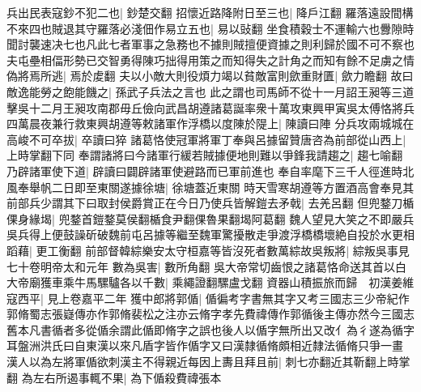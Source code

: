 兵出民表寇鈔不犯二也|{
	鈔楚交翻}
招懷近路降附日至三也|{
	降戶江翻}
羅落遠設間構不來四也賊退其守羅落必淺佃作易立五也|{
	易以䜴翻}
坐食積穀士不運輸六也釁隙時聞討襲速决七也凡此七者軍事之急務也不據則賊擅便資據之則利歸於國不可不察也夫屯壘相偪形勢已交智勇得陳巧拙得用策之而知得失之計角之而知有餘不足虜之情偽將焉所逃|{
	焉於䖍翻}
夫以小敵大則役煩力竭以貧敵富則歛重財匱|{
	歛力瞻翻}
故曰敵逸能勞之飽能饑之|{
	孫武子兵法之言也}
此之謂也司馬師不從十一月詔王昶等三道擊吳十二月王昶攻南郡毋丘儉向武昌胡遵諸葛誕率衆十萬攻東興甲寅吳太傅恪將兵四萬晨夜兼行救東興胡遵等敕諸軍作浮橋以度陳於隄上|{
	陳讀曰陣}
分兵攻兩城城在高峻不可卒拔|{
	卒讀曰猝}
諸葛恪使冠軍將軍丁奉與呂據留贊唐咨為前部從山西上|{
	上時掌翻下同}
奉謂諸將曰今諸軍行緩若賊據便地則難以爭鋒我請趨之|{
	趨七喻翻}
乃辟諸軍使下道|{
	辟讀曰闢辟諸軍使避路而已軍前進也}
奉自率麾下三千人徑進時北風奉舉帆二日即至東關遂據徐塘|{
	徐塘蓋近東關}
時天雪寒胡遵等方置酒高會奉見其前部兵少謂其下曰取封侯爵賞正在今日乃使兵皆解鎧去矛戟|{
	去羌呂翻}
但兜鍪刀楯倮身緣堨|{
	兜鍪首鎧鍪莫侯翻楯食尹翻倮魯果翻堨阿葛翻}
魏人望見大笑之不即嚴兵吳兵得上便鼓譟斫破魏前屯呂據等繼至魏軍驚擾散走爭渡浮橋橋壞絶自投於水更相蹈藉|{
	更工衡翻}
前部督韓綜樂安太守桓嘉等皆沒死者數萬綜故吳叛將|{
	綜叛吳事見七十卷明帝太和元年}
數為吳害|{
	數所角翻}
吳大帝常切齒恨之諸葛恪命送其首以白大帝廟獲車乘牛馬騾驢各以千數|{
	乘繩證翻騾盧戈翻}
資器山積振旅而歸　初漢姜維寇西平|{
	見上卷嘉平二年}
獲中郎將郭偱|{
	偱徧考字書無其字又考三國志三少帝紀作郭脩蜀志張嶷傳亦作郭脩裴松之注亦云脩字孝先費禕傳作郭循後主傳亦然今三國志舊本凡書循者多從偱余謂此偱即脩字之誤也後人以偱字無所出又改亻為彳遂為循字耳盤洲洪氏曰自東漢以來凡盾字皆作偱字又曰漢隸循脩頗相近隸法循脩只爭一畫}
漢人以為左將軍偱欲刺漢主不得親近每因上夀且拜且前|{
	刺七亦翻近其靳翻上時掌翻}
為左右所遏事輒不果|{
	為下偱殺費禕張本}


